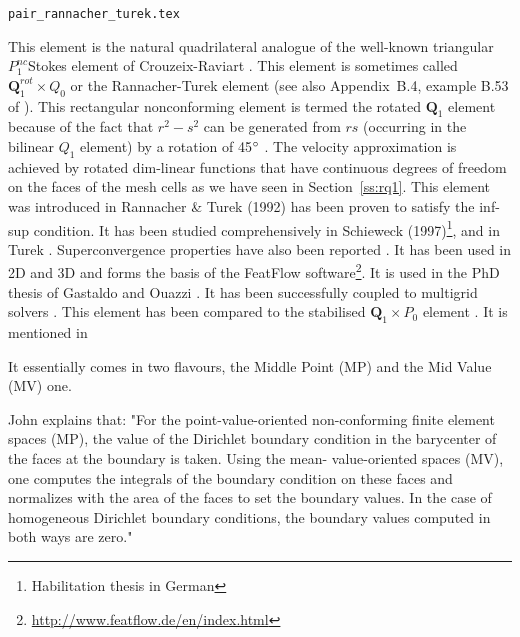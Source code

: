 
\begin{flushright} {\tiny {\color{gray} \tt pair\_rannacher\_turek.tex}} \end{flushright}

This element is the natural quadrilateral analogue
of the well-known triangular $P_1^{nc} $Stokes element of 
Crouzeix-Raviart \cite{crra73}.
This element is sometimes called ${\bm Q}_1^{rot} \times Q_0$ 
or the Rannacher-Turek element 
\cite[Section 3.6.5]{john16} (see also Appendix~B.4, example B.53 of \textcite{john16}).
This rectangular nonconforming \cite{crfa89} element is termed 
the rotated ${\bm Q}_1$ element because of the fact that $r^2-s^2$ can 
be generated from $rs$ (occurring in the bilinear $Q_1$ 
element) by a rotation of 45$\degree$ \cite[p93]{chen}.
The velocity approximation is achieved by rotated dim-linear functions that have 
continuous degrees of freedom on
the faces of the mesh cells as we have seen in Section~\ref{ss:rq1}.
This element was introduced in Rannacher \& Turek (1992) \cite{ratu92} 
has been proven to satisfy the inf-sup condition. It has been 
studied comprehensively in Schieweck 
(1997)\footnote{Habilitation thesis in German}, \cite{shzh06} and 
in Turek \cite{ture94,ture96}.
Superconvergence properties have also been reported \cite{misx06,misx07}.
It has been used in 2D \cite{maky17} and 3D \cite{klll96,gekm08} and forms 
the basis of the FeatFlow 
software\footnote{\url{http://www.featflow.de/en/index.html}}. 
It is used in the PhD thesis of Gastaldo \cite{gast07} and Ouazzi \cite{ouaz05}.
It has been successfully coupled to multigrid solvers \cite{chos98,tuos02}.
This element has been compared to the stabilised ${\bm Q}_1\times P_0$ 
element \cite{lisi13}. It is mentioned in \cite{hans11}

It essentially comes in two flavours, the Middle Point (MP) and the Mid Value (MV) one.

\begin{remark} 
John \cite{john16} explains that: "For the point-value-oriented 
non-conforming finite element spaces (MP), 
the value of the Dirichlet boundary
condition in the barycenter of the faces at the boundary is taken. Using the mean-
value-oriented spaces (MV), one computes the integrals of the boundary condition on
these faces and normalizes with the area of the faces to set the boundary values.
In the case of homogeneous Dirichlet boundary conditions, the boundary values
computed in both ways are zero."
\end{remark}

